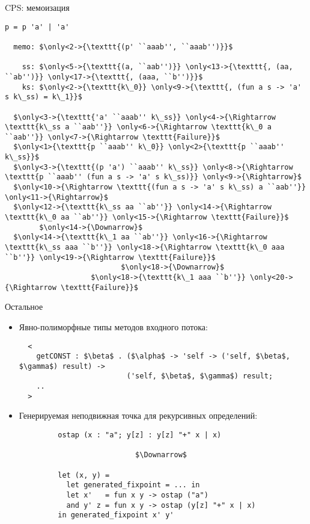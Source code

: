 \documentclass[10pt, mathserif]{beamer}
\theoremstyle{definition}
\begin{document}
\begin{frame}[fragile]{CPS: мемоизация}

\begin{lstlisting}[basicstyle=\small]
  p = p 'a' | 'a'

  memo: $\only<2->{\texttt{(p' ``aaab'', ``aaab'')}}$

    ss: $\only<5->{\texttt{(a, ``aab'')}} \only<13->{\texttt{, (aa, ``ab'')}} \only<17->{\texttt{, (aaa, ``b'')}}$
    ks: $\only<2->{\texttt{k\_0}} \only<9->{\texttt{, (fun a s -> 'a' s k\_ss) = k\_1}}$

  $\only<3->{\texttt{'a' ``aaab'' k\_ss}} \only<4->{\Rightarrow \texttt{k\_ss a ``aab''}} \only<6->{\Rightarrow \texttt{k\_0 a ``aab''}} \only<7->{\Rightarrow \texttt{Failure}}$
  $\only<1>{\texttt{p ``aaab'' k\_0}} \only<2>{\texttt{p ``aaab'' k\_ss}}$
  $\only<3->{\texttt{(p 'a') ``aaab'' k\_ss}} \only<8->{\Rightarrow \texttt{p ``aaab'' (fun a s -> 'a' s k\_ss)}} \only<9->{\Rightarrow}$
  $\only<10->{\Rightarrow \texttt{(fun a s -> 'a' s k\_ss) a ``aab''}} \only<11->{\Rightarrow}$
  $\only<12->{\texttt{k\_ss aa ``ab''}} \only<14->{\Rightarrow \texttt{k\_0 aa ``ab''}} \only<15->{\Rightarrow \texttt{Failure}}$
        $\only<14->{\Downarrow}$
  $\only<14->{\texttt{k\_1 aa ``ab''}} \only<16->{\Rightarrow \texttt{k\_ss aaa ``b''}} \only<18->{\Rightarrow \texttt{k\_0 aaa ``b''}} \only<19->{\Rightarrow \texttt{Failure}}$
                           $\only<18->{\Downarrow}$
                    $\only<18->{\texttt{k\_1 aaa ``b''}} \only<20->{\Rightarrow \texttt{Failure}}$
\end{lstlisting}

\end{frame}

\begin{frame}[fragile]{Остальное}

  \begin{itemize}
     \item Явно-полиморфные типы методов входного потока:

       \begin{lstlisting}
  <
    getCONST : $\beta$ . ($\alpha$ -> 'self -> ('self, $\beta$, $\gamma$) result) ->
                         ('self, $\beta$, $\gamma$) result;
    ..
  >
       \end{lstlisting}

     \item Генерируемая неподвижная точка для рекурсивных определений:

       \begin{lstlisting}
         ostap (x : "a"; y[z] : y[z] "+" x | x)

                           $\Downarrow$

         let (x, y) =
           let generated_fixpoint = ... in
           let x'   = fun x y -> ostap ("a")
           and y' z = fun x y -> ostap (y[z] "+" x | x)
         in generated_fixpoint x' y'
       \end{lstlisting}

  \end{itemize}

\end{frame}
\end{document}
